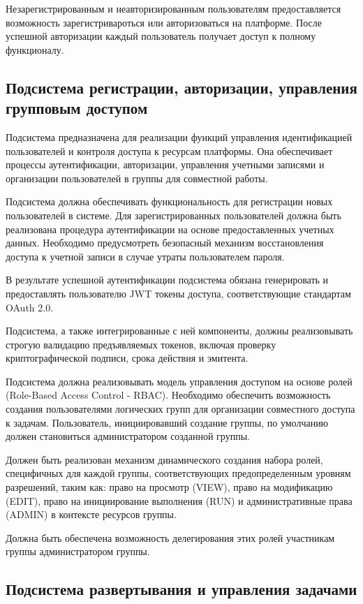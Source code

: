 Незарегистрированным и неавторизированным пользователям предоставляется возможность зарегистривароться или авторизоваться на платформе. После успешной авторизации каждый пользователь получает доступ к полному функционалу.

\subsection{Подсистема регистрации, авторизации, управления групповым доступом}

Подсистема предназначена для реализации функций управления идентификацией пользователей и контроля доступа к ресурсам платформы. Она обеспечивает процессы аутентификации, авторизации, управления учетными записями и организации пользователей в группы для совместной работы.

Подсистема должна обеспечивать функциональность для регистрации новых пользователей в системе. Для зарегистрированных пользователей должна быть реализована процедура аутентификации на основе предоставленных учетных данных. Необходимо предусмотреть безопасный механизм восстановления доступа к учетной записи в случае утраты пользователем пароля.

В результате успешной аутентификации подсистема обязана генерировать и предоставлять пользователю JWT токены доступа, соответствующие стандартам OAuth 2.0. 

Подсистема, а также интегрированные с ней компоненты, должны реализовывать строгую валидацию предъявляемых токенов, включая проверку криптографической подписи, срока действия и эмитента.

Подсистема должна реализовывать модель управления доступом на основе ролей (Role-Based Access Control - RBAC). Необходимо обеспечить возможность создания пользователями логических групп для организации совместного доступа к задачам. Пользователь, инициировавший создание группы, по умолчанию должен становиться администратором созданной группы.

Должен быть реализован механизм динамического создания набора ролей, специфичных для каждой группы, соответствующих предопределенным уровням разрешений, таким как: право на просмотр (VIEW), право на модификацию (EDIT), право на инициирование выполнения (RUN) и административные права (ADMIN) в контексте ресурсов группы.

Должна быть обеспечена возможность делегирования этих ролей участникам группы администратором группы.

\subsection{Подсистема развертывания и управления задачами}

